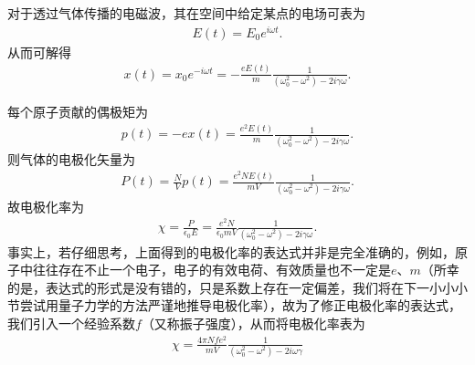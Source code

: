 \documentclass[a4paper, 10pt]{article}
\begin{document}
\begin{multicols*}{2}
对于透过气体传播的电磁波，其在空间中给定某点的电场可表为
\begin{align}
    E(t)=E_0e^{i\omega t}.
\end{align}
从而可解得
\begin{align}
    x(t)=x_0e^{-i\omega t}=-\frac{eE(t)}{m}\frac{1}{(\omega_0^2-\omega^2)-2i\gamma\omega}.
\end{align}

每个原子贡献的偶极矩为
\begin{align}
    p(t)=-ex(t)=\frac{e^2E(t)}{m}\frac{1}{(\omega_0^2-\omega^2)-2i\gamma\omega}.
\end{align}
则气体的电极化矢量为
\begin{align}
    P(t)=\frac{N}{V}p(t)=\frac{e^2NE(t)}{mV}\frac{1}{(\omega_0^2-\omega^2)-2i\gamma\omega}.
\end{align}
故电极化率为
\begin{align}
    \chi=\frac{P}{\epsilon_0E}=\frac{e^2N}{\epsilon_0mV}\frac{1}{(\omega_0^2-\omega^2)-2i\gamma\omega}.
\end{align}
事实上，若仔细思考，上面得到的电极化率的表达式并非是完全准确的，例如，原子中往往存在不止一个电子，电子的有效电荷、有效质量也不一定是$e$、$m$（所幸的是，表达式的形式是没有错的，只是系数上存在一定偏差，我们将在下一小小小节尝试用量子力学的方法严谨地推导电极化率），故为了修正电极化率的表达式，我们引入一个经验系数$f$（又称振子强度），从而将电极化率表为
\begin{align}
    \chi=\frac{4\pi Nfe^2}{mV}\frac{1}{(\omega_0^2-\omega^2)-2i\omega\gamma}
\end{align}


\end{multicols*}
\end{document}
